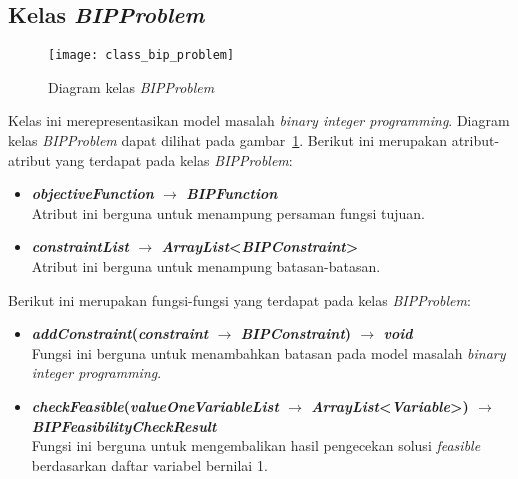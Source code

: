 \subsection{Kelas \textit{BIPProblem}}
\begin{figure}[H]
	\centering  
	\texttt{[image: class\_bip\_problem]}
	\caption[Diagram kelas \textit{BIPProblem}]{Diagram kelas \textit{BIPProblem}}
	\label{fig:class_bip_problem}
\end{figure}
Kelas ini merepresentasikan model masalah \textit{binary integer programming}. Diagram kelas \textit{BIPProblem} dapat dilihat pada gambar~\ref{fig:class_bip_problem}. Berikut ini merupakan atribut-atribut yang terdapat pada kelas \textit{BIPProblem}:
\begin{itemize}
	\item \textbf{\textit{objectiveFunction} $\rightarrow$ \textit{BIPFunction}}\\
	Atribut ini berguna untuk menampung persaman fungsi tujuan.
	\item \textbf{\textit{constraintList} $\rightarrow$ \textit{ArrayList}<\textit{BIPConstraint}>}\\
	Atribut ini berguna untuk menampung batasan-batasan.
\end{itemize}
Berikut ini merupakan fungsi-fungsi yang terdapat pada kelas \textit{BIPProblem}:
\begin{itemize}
	\item \textbf{\textit{addConstraint}(\textit{constraint} $\rightarrow$ \textit{BIPConstraint}) $\rightarrow$ \textit{void}}\\
	Fungsi ini berguna untuk menambahkan batasan pada model masalah \textit{binary integer programming}.
	\item \textbf{\textit{checkFeasible}(\textit{valueOneVariableList} $\rightarrow$ \textit{ArrayList}<\textit{Variable}>) $\rightarrow$ \textit{BIPFeasibilityCheckResult}}\\
	Fungsi ini berguna untuk mengembalikan hasil pengecekan solusi \textit{feasible} berdasarkan daftar variabel bernilai 1.
\end{itemize}

